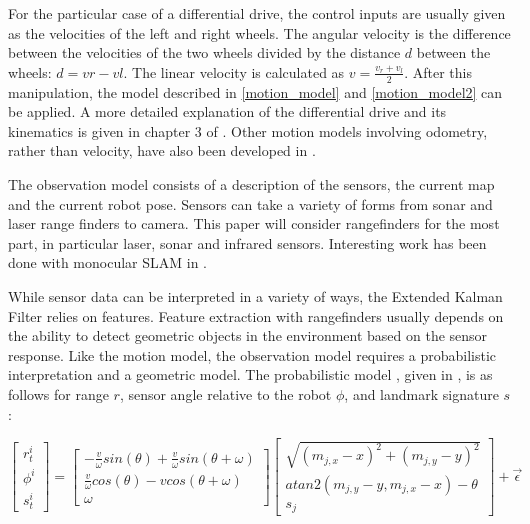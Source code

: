 For the particular case of a differential drive, the control inputs are usually given as the velocities of the left and right wheels.  The angular velocity is the difference between the velocities of the two wheels divided by the distance $d$ between the wheels:  $d=vr-vl$.  The linear velocity is calculated as $v=\frac{v_r+v_l}{2}$.  After this manipulation, the model described in \ref{motion_model} and \ref{motion_model2} can be applied.  A more detailed explanation of the differential drive and its kinematics is given in chapter 3 of \cite{Dudek}.  Other motion models involving odometry, rather than velocity, have also been developed in \cite{ThrunPR2005}.

The observation model consists of a description of the sensors, the current map and the current robot pose.  Sensors can take a variety of forms from sonar and laser range finders to camera.  This paper will consider rangefinders for the most part, in particular laser, sonar and infrared sensors.  Interesting work has been done with monocular SLAM in \cite{MonoSLAM}.  

While sensor data can be interpreted in a variety of ways, the Extended Kalman Filter relies on features.  Feature extraction with rangefinders usually depends on the ability to detect geometric objects in the environment based on the sensor response.  Like the motion model, the observation model requires a probabilistic interpretation and a geometric model.  The probabilistic model , given in \cite{ThrunPR2005}, is as follows for range $r$, sensor angle relative to the robot $\phi$, and landmark signature $s$:

\begin{equation}\label{motion_model}
\left[ {\begin{array}{cc}
 r_{t}^{i} \\
 \phi^{i} \\
 s_{t}^{i}
\end{array} } \right] =
\left[ {\begin{array}{cc}
 -\frac{v}{\omega} sin(\theta)+\frac{v}{\omega} sin(\theta + \omega) \\
 \frac{v}{\omega} cos(\theta)-v cos(\theta + \omega)  \\
\omega
\end{array} } \right] 
\left[ {\begin{array}{cc}
\sqrt{(m_{j,x}-x)^2+(m_{j,y}-y)^2} \\
atan2(m_{j,y}-y,m_{j,x}-x)-\theta \\
s_j
\end{array} } \right] 
+ \vec{\epsilon}
\end{equation}

